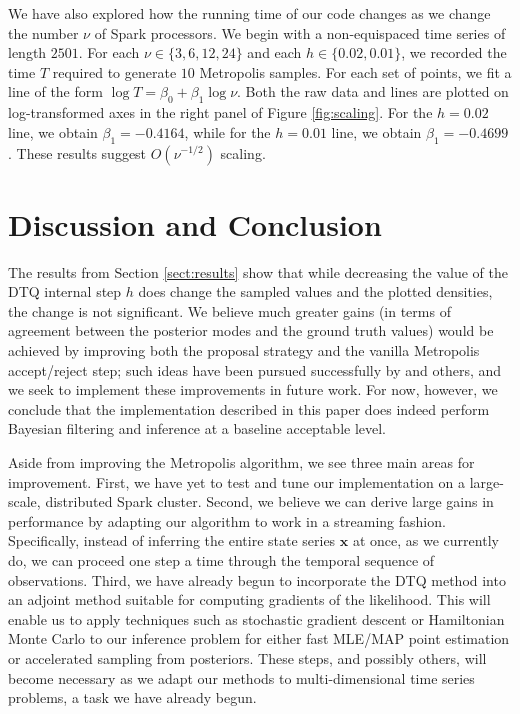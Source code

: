 \documentclass[wcp]{jmlr}
\begin{document}
We have also explored how the running time of our code changes as we
change the number $\nu$ of Spark processors.  We begin with a non-equispaced
time series of length $2501$.  For each $\nu \in \{3, 6, 12, 24\}$ and
each $h \in \{0.02,0.01\}$, we
recorded the time $T$ required to 
generate $10$ Metropolis samples.  For each set of points, we fit a
line of the form $\log T = \beta_0 + \beta_1 \log \nu$.  Both the raw
data and lines are plotted on log-transformed axes in the right panel
of Figure \ref{fig:scaling}.  For the
$h=0.02$ line, we obtain $\beta_1=-0.4164$, while for the $h=0.01$
line, we obtain $\beta_1=-0.4699$.  These results suggest $O(\nu^{-1/2})$ scaling.

\section{Discussion and Conclusion}
\label{sect:conclusion}
The results from Section \ref{sect:results}
show that while decreasing the value of the DTQ internal step $h$ does
change the sampled values and the plotted densities, the change is not
significant.  We believe much greater gains (in terms of agreement
between the posterior modes and the ground truth values) would be achieved by
improving both the proposal strategy and the vanilla Metropolis
accept/reject step; such ideas have been pursued successfully by \citet{fuchs2013inference} and others, and we seek
to implement these improvements in future work.  For now, however, we
conclude that the implementation described in this paper does indeed
perform Bayesian filtering and inference at a baseline acceptable
level.

Aside from improving the Metropolis algorithm, we see three main
areas for improvement.  First, we have yet to test and tune our implementation
on a large-scale, distributed Spark cluster. 
Second, we believe we can derive large gains in performance by
adapting our algorithm to work in a streaming fashion.  Specifically,
instead of inferring the entire state series $\mathbf{x}$ at once, as
we currently do, we can proceed one step a time through the temporal
sequence of observations.  Third, we have already begun to incorporate
the DTQ method into an adjoint method suitable for computing gradients of the
likelihood.  This will enable us to apply techniques such as
stochastic gradient descent or Hamiltonian Monte Carlo to our
inference problem for either fast MLE/MAP point estimation or
accelerated sampling from posteriors.  These steps, and possibly
others, will become  necessary as we adapt our methods to
multi-dimensional time series problems, a task we have already begun.



\end{document}

